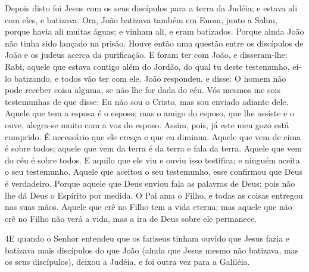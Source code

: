 Depois disto foi Jesus com os seus discípulos para a terra da
Judéia; e estava ali com eles, e batizava. Ora, João batizava
também em Enom, junto a Salim, porque havia ali muitas águas; e
vinham ali, e eram batizados. Porque ainda João não tinha
sido lançado na prisão. Houve então uma questão entre os
discípulos de João e os judeus acerca da purificação. E foram
ter com João, e disseram-lhe: Rabi, aquele que estava contigo além
do Jordão, do qual tu deste testemunho, ei-lo batizando, e todos vão
ter com ele. João respondeu, e disse: O homem não pode
receber coisa alguma, se não lhe for dada do céu. Vós mesmos
me sois testemunhas de que disse: Eu não sou o Cristo, mas sou
enviado adiante dele. Aquele que tem a esposa é o esposo; mas
o amigo do esposo, que lhe assiste e o ouve, alegra-se muito com a
voz do esposo. Assim, pois, já este meu gozo está cumprido. É
necessário que ele cresça e que eu diminua. Aquele que vem de
cima é sobre todos; aquele que vem da terra é da terra e fala da
terra. Aquele que vem do céu é sobre todos. E aquilo que ele
viu e ouviu isso testifica; e ninguém aceita o seu testemunho.
Aquele que aceitou o seu testemunho, esse confirmou que Deus
é verdadeiro. Porque aquele que Deus enviou fala as palavras
de Deus; pois não lhe dá Deus o Espírito por medida. O Pai
ama o Filho, e todas as coisas entregou nas suas mãos. Aquele
que crê no Filho tem a vida eterna; mas aquele que não crê no Filho
não verá a vida, mas a ira de Deus sobre ele permanece.

\medskip

\lettrine{4} E quando o Senhor entendeu que os fariseus tinham
ouvido que Jesus fazia e batizava mais discípulos do que João
 (ainda que Jesus mesmo não batizava, mas os seus discípulos),
deixou a Judéia, e foi outra vez para a Galiléia.

